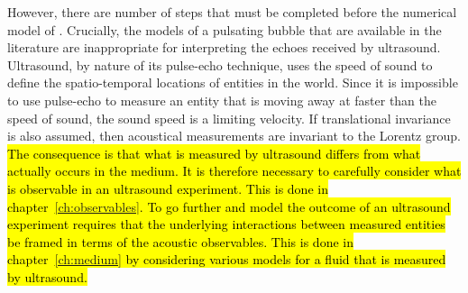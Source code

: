 However, there are number of steps that must be completed before the numerical model of .
Crucially, the models of a pulsating bubble that are available in the literature
are inappropriate for interpreting the echoes received by ultrasound.
Ultrasound, by nature of its pulse-echo technique,
uses the speed of sound to define the spatio-temporal locations of entities in the world.
Since it is impossible to use pulse-echo to measure an entity that is moving away at faster than the speed of sound,
the sound speed is a limiting velocity.
If translational invariance is also assumed,  then acoustical measurements are  invariant to the Lorentz group. 
\hl{The consequence is that what is measured by ultrasound differs from what actually occurs in the medium.
It is therefore necessary to carefully consider what is observable in an ultrasound experiment.
This is done in chapter~{\ref{ch:observables}}.
To go further and model the outcome of an ultrasound experiment requires that the underlying interactions between measured entities be framed in terms of the acoustic observables.
This is done in chapter~{\ref{ch:medium}} by considering various models for a fluid that is measured by ultrasound.
}


